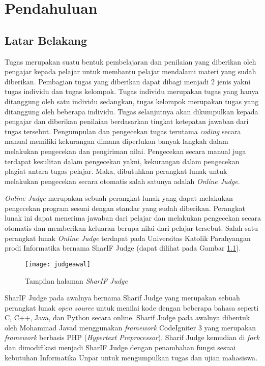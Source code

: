 \chapter{Pendahuluan}
\label{chap:intro}
   
\section{Latar Belakang}
\label{sec:label}

Tugas merupakan suatu bentuk pembelajaran dan penilaian yang diberikan oleh pengajar kepada pelajar untuk membantu pelajar mendalami materi yang sudah diberikan\cite{prihatini:16:plagiarisme}. Pembagian tugas yang diberikan dapat dibagi menjadi 2 jenis yakni tugas individu dan tugas kelompok. Tugas individu merupakan tugas yang hanya ditanggung oleh satu individu sedangkan, tugas kelompok merupakan tugas yang ditanggung oleh beberapa individu. Tugas selanjutnya akan dikumpulkan kepada pengajar dan diberikan penilaian berdasarkan tingkat ketepatan jawaban dari tugas tersebut. Pengumpulan dan pengecekan tugas terutama \textit{coding} secara manual memiliki kekurangan dimana diperlukan banyak langkah dalam melakukan pengecekan dan pengiriman nilai. Pengecekan secara manual juga terdapat kesulitan dalam pengecekan yakni, kekurangan dalam pengecekan plagiat antara tugas pelajar. Maka, dibutuhkan perangkat lunak untuk melakukan pengecekan secara otomatis salah satunya adalah \textit{Online Judge}.

\textit{Online Judge} merupakan sebuah perangkat lunak yang dapat melakukan pengecekan program sesuai dengan standar yang sudah diberikan. Perangkat lunak ini dapat menerima jawaban dari pelajar dan melakukan pengecekan secara otomatis dan memberikan keluaran berupa nilai dari pelajar tersebut\cite{kurnia:01:judge}. Salah satu perangkat lunak \textit{Online Judge} terdapat pada Universitas Katolik Parahyangan prodi Informatika bernama SharIF Judge (dapat dilihat pada Gambar \ref{fig:judgeawal}). 

\begin{figure}[H]
	\centering  
	\texttt{[image: judgeawal]}  
	\caption[Tampilan halaman \textit{SharIF Judge}]{Tampilan halaman \textit{SharIF Judge}} 
	\label{fig:judgeawal} 
\end{figure} 


SharIF Judge pada awalnya bernama Sharif Judge yang merupakan sebuah perangkat lunak \textit{open source} untuk menilai kode dengan beberapa bahasa seperti C, C++, Java, dan Python secara online. Sharif Judge pada awalnya dibentuk oleh Mohammad Javad menggunakan \textit{framework} CodeIgniter 3 yang merupakan \textit{framework} berbasis PHP (\textit{Hypertext Preprocessor}).  Sharif Judge kemudian di \textit{fork} dan dimodifikasi menjadi SharIF Judge dengan penambahan fungsi sesuai kebutuhan Informatika Unpar untuk mengumpulkan tugas dan ujian mahasiswa\cite{sharif:23}.

